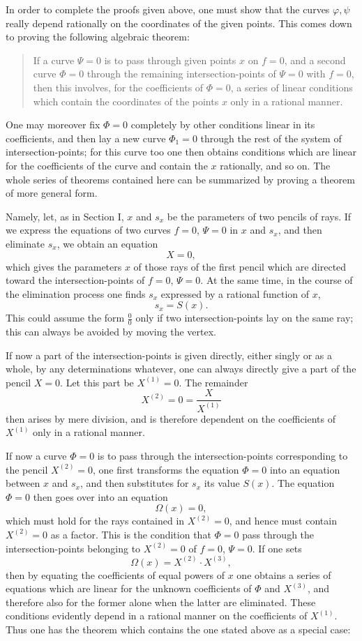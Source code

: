 \documentclass[10pt]{article}
\begin{document}
In order to complete the proofs given above, one must show that the curves \(\varphi,\psi\) really depend rationally on the coordinates of the given points. This comes down to proving the following algebraic theorem:

\begin{quote}
If a curve \(\Psi=0\) is to pass through given points \(x\) on \(f=0\), and a second curve \(\Phi=0\) through the remaining intersection-points of \(\Psi=0\) with \(f=0\), then this involves, for the coefficients of \(\Phi=0\), a series of linear conditions which contain the coordinates of the points \(x\) only in a rational manner.
\end{quote}

One may moreover fix \(\Phi=0\) completely by other conditions linear in its coefficients, and then lay a new curve \(\Phi_1=0\) through the rest of the system of intersection-points; for this curve too one then obtains conditions which are linear for the coefficients of the curve and contain the \(x\) rationally, and so on. The whole series of theorems contained here can be summarized by proving a theorem of more general form.

Namely, let, as in Section I, \(x\) and \(s_x\) be the parameters of two pencils of rays. If we express the equations of two curves \(f=0\), \(\Psi=0\) in \(x\) and \(s_x\), and then eliminate \(s_x\), we obtain an equation
\[
X=0,
\]
which gives the parameters \(x\) of those rays of the first pencil which are directed toward the intersection-points of \(f=0\), \(\Psi=0\). At the same time, in the course of the elimination process one finds \(s_x\) expressed by a rational function of \(x\),
\[
s_x=S(x).
\]
This could assume the form \(\frac{0}{0}\) only if two intersection-points lay on the same ray; this can always be avoided by moving the vertex.

If now a part of the intersection-points is given directly, either singly or as a whole, by any determinations whatever, one can always directly give a part of the pencil \(X=0\). Let this part be \(X^{(1)}=0\). The remainder
\[
X^{(2)}=0=\frac{X}{X^{(1)}}
\]
then arises by mere division, and is therefore dependent on the coefficients of \(X^{(1)}\) only in a rational manner.

If now a curve \(\Phi=0\) is to pass through the intersection-points corresponding to the pencil \(X^{(2)}=0\), one first transforms the equation \(\Phi=0\) into an equation between \(x\) and \(s_x\), and then substitutes for \(s_x\) its value \(S(x)\). The equation \(\Phi=0\) then goes over into an equation
\[
\Omega(x)=0,
\]
which must hold for the rays contained in \(X^{(2)}=0\), and hence must contain \(X^{(2)}=0\) as a factor. This is the condition that \(\Phi=0\) pass through the intersection-points belonging to \(X^{(2)}=0\) of \(f=0\), \(\Psi=0\). If one sets
\[
\Omega(x)=X^{(2)}\cdot X^{(3)},
\]
then by equating the coefficients of equal powers of \(x\) one obtains a series of equations which are linear for the unknown coefficients of \(\Phi\) and \(X^{(3)}\), and therefore also for the former alone when the latter are eliminated. These conditions evidently depend in a rational manner on the coefficients of \(X^{(1)}\). Thus one has the theorem which contains the one stated above as a special case:
\end{document}
